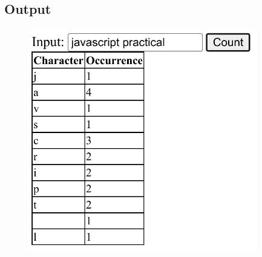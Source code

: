 \documentclass{article}
\begin{document}
\subsection*{Output}
\begin{figure}[H]
  \centering
  \includegraphics[width=10cm]{4/out.png}
\end{figure}
\end{document}

